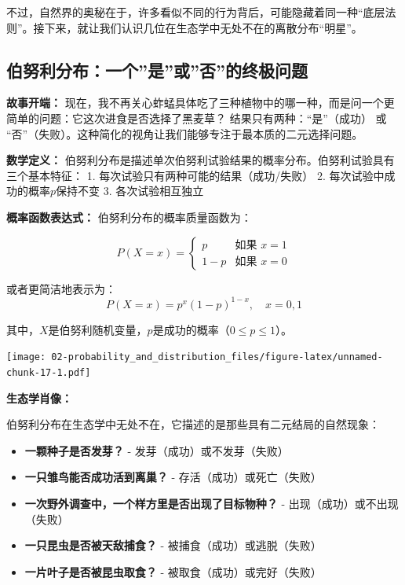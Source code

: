 \documentclass[
  twoside]{book}
\providecommand{\tightlist}{%
  \setlength{\itemsep}{0pt}\setlength{\parskip}{0pt}}
\begin{document}
不过，自然界的奥秘在于，许多看似不同的行为背后，可能隐藏着同一种``底层法则''。接下来，就让我们认识几位在生态学中无处不在的离散分布``明星''。

\hypertarget{ux4f2fux52aaux5229ux5206ux5e03ux4e00ux4e2aux662fux6216ux5426ux7684ux7ec8ux6781ux95eeux9898}{%
\subsection{伯努利分布：一个''是''或''否''的终极问题}\label{ux4f2fux52aaux5229ux5206ux5e03ux4e00ux4e2aux662fux6216ux5426ux7684ux7ec8ux6781ux95eeux9898}}

\textbf{故事开端：} 现在，我不再关心蚱蜢具体吃了三种植物中的哪一种，而是问一个更简单的问题：它这次进食是否选择了黑麦草？ 结果只有两种：``是''（成功） 或 ``否''（失败）。这种简化的视角让我们能够专注于最本质的二元选择问题。

\textbf{数学定义：} 伯努利分布是描述单次伯努利试验结果的概率分布。伯努利试验具有三个基本特征：
1. 每次试验只有两种可能的结果（成功/失败）
2. 每次试验中成功的概率\(p\)保持不变
3. 各次试验相互独立

\textbf{概率函数表达式：} 伯努利分布的概率质量函数为：

\[P(X = x) = \begin{cases}
p & \text{如果 } x = 1 \\
1-p & \text{如果 } x = 0
\end{cases}\]

或者更简洁地表示为：
\[P(X = x) = p^x(1-p)^{1-x}, \quad x = 0,1\]

其中，\(X\)是伯努利随机变量，\(p\)是成功的概率（\(0 \leq p \leq 1\)）。

\texttt{[image: 02-probability\_and\_distribution\_files/figure-latex/unnamed-chunk-17-1.pdf]}

\textbf{生态学肖像：}

伯努利分布在生态学中无处不在，它描述的是那些具有二元结局的自然现象：

\begin{itemize}
\tightlist
\item
  \textbf{一颗种子是否发芽？} - 发芽（成功）或不发芽（失败）
\item
  \textbf{一只雏鸟能否成功活到离巢？} - 存活（成功）或死亡（失败）
\item
  \textbf{一次野外调查中，一个样方里是否出现了目标物种？} - 出现（成功）或不出现（失败）
\item
  \textbf{一只昆虫是否被天敌捕食？} - 被捕食（成功）或逃脱（失败）
\item
  \textbf{一片叶子是否被昆虫取食？} - 被取食（成功）或完好（失败）
\end{itemize}
\end{document}
